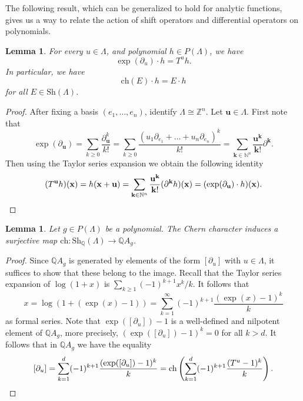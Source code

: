 \documentclass[oneside]{amsart}
\theoremstyle{plain}
\newtheorem{lemma}[theorem]{Lemma}
\theoremstyle{definition}
\newcommand{\Z}{{\mathbb{Z}}}
\newcommand{\N}{{\mathbb{N}}}
\newcommand{\Q}{{\mathbb{Q}}}
\newcommand{\Sh}{{\mathrm{Sh}}}
\newcommand{\ch}{{\mathrm{ch}}}
\renewcommand{\vec}[1]{\ensuremath{\mathbf{#1}}}
\begin{document}
The following result, which can be generalized to hold for analytic functions, gives us a way to relate the action of shift operators and differential operators on polynomials.

\begin{lemma}
\label{lem:exponential and shifts}
For every $u\in \Lambda$, and polynomial $h \in P(\Lambda)$, we have 
\[
\exp(\partial_u) \cdot h = T^u h .
\]
In particular, we have 
\[
\ch(E) \cdot h=E \cdot h
\]
for all $E\in \Sh(\Lambda)$.
\end{lemma}

\begin{proof}
    After fixing a basis $(e_1, \dots, e_n)$,
    identify $\Lambda \cong \Z^n$. Let $\vec u \in \Lambda$. First note that
    \[
    \exp(\partial_{\vec u}) = \sum_{k \geq 0} \frac{\partial_{\vec u}^k}{k!}
    = \sum_{k \geq 0} \frac{(u_1 \partial_{e_1} + \dots + u_n \partial_{e_n})^k}{k!}
    = \sum_{\vec k \in \N^n}\frac{\vec u ^{\vec k}}{\vec k !}\partial^{\vec k}.
    \]
    Then using the Taylor series expansion we obtain the following identity
    \[
        (T^{\vec u}h)(\vec x)= h(\vec x + \vec u) = \sum_{\vec k \in \N^n} \frac{\vec u ^{\vec k}}{\vec k!} (\partial^{\vec k} h)(\vec x) = (\exp(\partial_{\vec u})\cdot h)(\vec x).
    \qedhere
    \]
\end{proof}

\begin{lemma}
    \label{lem:ch-surjective}
    Let $g \in P(\Lambda)$ be a polynomial. The Chern character induces a surjective map
    $\ch: \Sh_\Q(\Lambda) \to \Q A_g$. 
\end{lemma}

\begin{proof}
    Since $\Q A_g$ is generated by elements of the form $[\partial_u]$ with $u \in \Lambda$,
    it suffices to show that these belong to the image. Recall that the Taylor series expansion of $\log(1 + x)$
    is $\sum_{k \geq 1} (-1)^{k + 1} x^k/k$. It follows that
    \[
        x = \log(1 + (\exp(x) - 1)) = \sum_{k = 1}^\infty (-1)^{k+1} \frac{(\exp(x) - 1)^k}{k}
    \]
    as formal series. Note that $\exp([\partial_u]) - 1$ is a well-defined and nilpotent element of $\Q A_g$, more precisely, $(\exp([\partial_u]) - 1)^k = 0$ for all $k > d$.
    It follows that in $\Q A_g$ we have the equality
    \[
        [\partial_u] = \sum_{k = 1}^d (-1)^{k+1} \frac{(\exp([\partial_u]) - 1)^k}{k}
        = \ch\left(\sum_{k = 1}^d (-1)^{k+1} \frac{(T^u - 1)^k}{k}\right).
        \qedhere
    \]
\end{proof}
\end{document}
